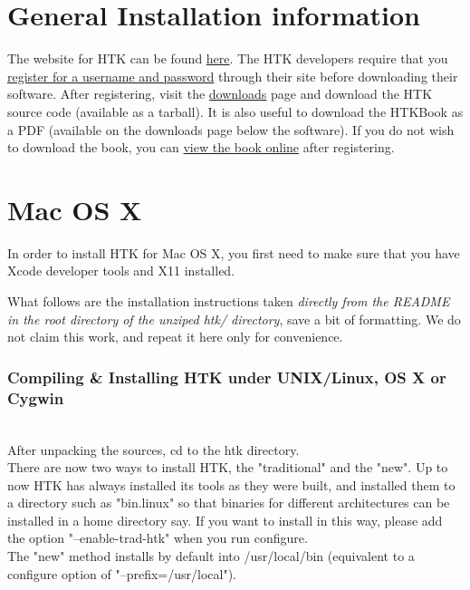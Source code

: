 \documentclass{wileySev}
\begin{document}
\section{General Installation information}
The website for HTK can be found \href{http://htk.eng.cam.ac.uk/}{here}. The HTK developers require that you \href{http://htk.eng.cam.ac.uk/register.shtml}{register for a username and password} through their site before downloading their software. After registering, visit the \href{http://htk.eng.cam.ac.uk/download.shtml}{downloads} page and download the HTK source code (available as a tarball). It is also useful to download the HTKBook as a PDF (available on the downloads page below the software). If you do not wish to download the book, you can \href{http://htk.eng.cam.ac.uk/docs/docs.shtml}{view the book online} after registering.

\section{Mac OS X}
In order to install HTK for Mac OS X, you first need to make sure that you have Xcode developer tools and X11 installed.

What follows are the installation instructions taken \textit{directly from the README in the root directory of the unziped htk/ directory}, save a bit of formatting. We do not claim this work, and repeat it here only for convenience.\\

\subsubsection{Compiling \& Installing HTK under UNIX/Linux, OS X or Cygwin}~\\

After unpacking the sources, cd to the htk directory.\\

There are now two ways to install HTK, the "traditional" and the
"new".  Up to now HTK has always installed its tools as they were
built, and installed them to a directory such as "bin.linux" so that
binaries for different architectures can be installed in a home
directory say.  If you want to install in this way, please add the
option "--enable-trad-htk" when you run configure.\\

The "new" method installs by default into /usr/local/bin (equivalent
to a configure option of "--prefix=/usr/local").\\
\end{document}
